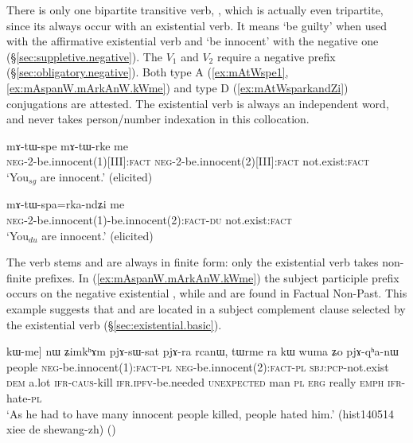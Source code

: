 There is only one bipartite transitive verb, , which is actually even tripartite, since its always occur with an existential verb. It means `be guilty' when used with the affirmative existential verb  and  `be innocent' with the negative one  (§\ref{sec:suppletive.negative}). The $V_1$ and $V_2$ require a negative prefix (§\ref{sec:obligatory.negative}). Both type A (\ref{ex:mAtWspe1}, \ref{ex:mAspanW.mArkAnW.kWme}) and type D (\ref{ex:mAtWsparkandZi}) conjugations are attested. The existential verb is always an independent word, and never takes person/number indexation in this collocation. 

\begin{exe}
\ex \label{ex:mAtWspe1}
\gll  mɤ-tɯ-spe mɤ-tɯ-rke me \\
\textsc{neg}-2-be.innocent(1)[III]:\textsc{fact} \textsc{neg}-2-be.innocent(2)[III]:\textsc{fact} not.exist:\textsc{fact} \\
\glt `You$_{sg}$ are innocent.' (elicited)
\end{exe} 
 
\begin{exe}
\ex \label{ex:mAtWsparkandZi}
\gll  mɤ-tɯ-spa=rka-ndʑi me  \\
\textsc{neg}-2-be.innocent(1)-be.innocent(2):\textsc{fact}-\textsc{du} not.exist:\textsc{fact} \\
\glt `You$_{du}$ are innocent.' (elicited)
\end{exe} 

The verb stems  and  are always in finite form: only the existential verb takes non-finite prefixes. In (\ref{ex:mAspanW.mArkAnW.kWme}) the subject participle prefix  occurs on the negative existential , while   and  are found in Factual Non-Past. This example suggests that   and  are located in a subject complement clause selected by the existential verb (§\ref{sec:existential.basic}).

  \begin{exe}
\ex \label{ex:mAspanW.mArkAnW.kWme}
\gll [mkʰɤrmaŋ [mɤ-spa-nɯ mɤ-rka-nɯ] kɯ-me] nɯ ʑimkʰɤm pjɤ-sɯ-sat pjɤ-ra rcanɯ, tɯrme ra kɯ wuma ʑo pjɤ-qʰa-nɯ  \\
people \textsc{neg}-be.innocent(1):\textsc{fact}-\textsc{pl} \textsc{neg}-be.innocent(2):\textsc{fact}-\textsc{pl} \textsc{sbj}:\textsc{pcp}-not.exist \textsc{dem} a.lot \textsc{ifr}-\textsc{caus}-kill \textsc{ifr}.\textsc{ipfv}-be.needed \textsc{unexpected} man \textsc{pl} \textsc{erg} really \textsc{emph} \textsc{ifr}-hate-\textsc{pl} \\
 \glt `As he had to have many innocent people killed, people hated him.' (hist140514 xiee de shewang-zh)
()
\end{exe} 
  

